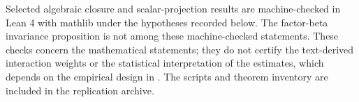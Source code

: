 Selected algebraic closure and scalar-projection results are machine-checked
in Lean 4 with mathlib under the hypotheses recorded below.
The factor-beta invariance proposition is not among these
machine-checked statements.
These checks concern the mathematical statements; they do not certify the
text-derived interaction weights or the statistical interpretation of the
estimates, which depends on the empirical design in .
The scripts and theorem inventory are included in the replication archive.

\ppLeanStatusList

